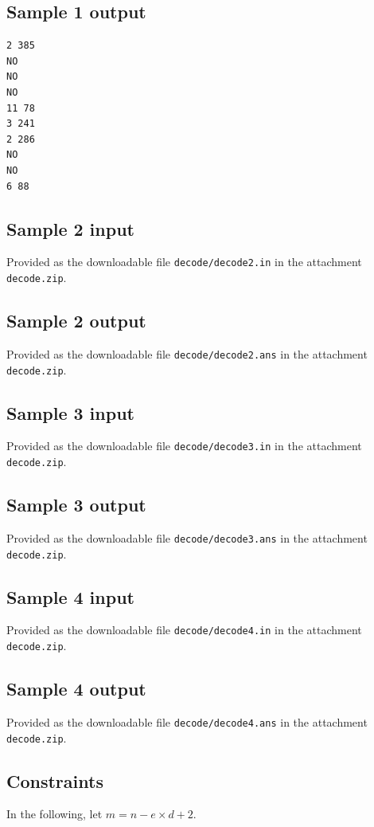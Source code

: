 \documentclass[11pt]{article}
\begin{document}
\subsection*{Sample 1 output}
\begin{verbatim}
2 385
NO
NO
NO
11 78
3 241
2 286
NO
NO
6 88
\end{verbatim}

\subsection*{Sample 2 input}
Provided as the downloadable file \texttt{decode/decode2.in}
in the attachment \texttt{decode.zip}.

\subsection*{Sample 2 output}
Provided as the downloadable file \texttt{decode/decode2.ans}
in the attachment \texttt{decode.zip}.

\subsection*{Sample 3 input}
Provided as the downloadable file \texttt{decode/decode3.in}
in the attachment \texttt{decode.zip}.

\subsection*{Sample 3 output}
Provided as the downloadable file \texttt{decode/decode3.ans}
in the attachment \texttt{decode.zip}.

\subsection*{Sample 4 input}
Provided as the downloadable file \texttt{decode/decode4.in}
in the attachment \texttt{decode.zip}.

\subsection*{Sample 4 output}
Provided as the downloadable file \texttt{decode/decode4.ans}
in the attachment \texttt{decode.zip}.

\subsection*{Constraints}
In the following, let $m=n-e\times d+2$.
\end{document}
